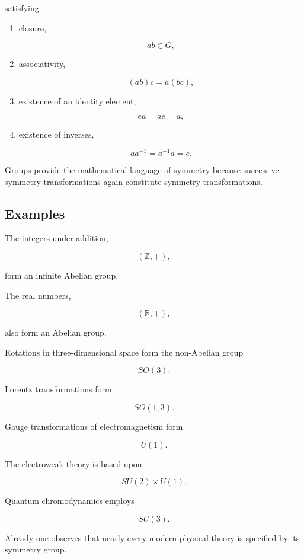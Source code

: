 satisfying

\begin{enumerate}

\item closure,

\[
ab\in G,
\]

\item associativity,

\[
(ab)c
=
a(bc),
\]

\item existence of an identity element,

\[
ea=ae=a,
\]

\item existence of inverses,

\[
aa^{-1}
=
a^{-1}a
=
e.
\]

\end{enumerate}

Groups provide the mathematical language of symmetry because successive
symmetry transformations again constitute symmetry transformations.


\subsection{Examples}

The integers under addition,

\[
(\mathbb Z,+),
\]

form an infinite Abelian group.

The real numbers,

\[
(\mathbb R,+),
\]

also form an Abelian group.

Rotations in three-dimensional space form the non-Abelian group

\[
SO(3).
\]

Lorentz transformations form

\[
SO(1,3).
\]

Gauge transformations of electromagnetism form

\[
U(1).
\]

The electroweak theory is based upon

\[
SU(2)\times U(1).
\]

Quantum chromodynamics employs

\[
SU(3).
\]

Already one observes that nearly every modern physical theory is
specified by its symmetry group.

